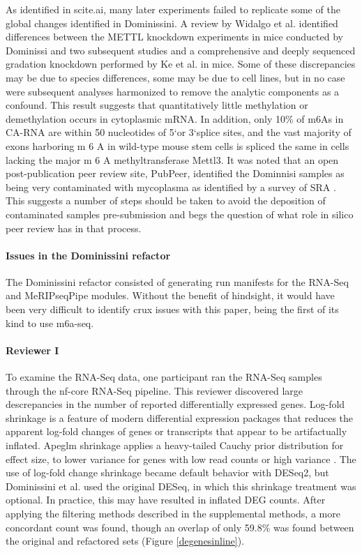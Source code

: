 \documentclass{drexelthesis}
\begin{document}
As identified in scite.ai, many later experiments failed to replicate some of the global changes identified in Dominissini. A review by Widalgo et al. \cite{Widagdo2018-vw} identified differences between the METTL knockdown experiments in mice conducted by Dominissi and two subsequent studies and a comprehensive and deeply sequenced gradation knockdown performed by Ke et al. \cite{Ke2017-lh} in mice. Some of these discrepancies may be due to species differences, some may be due to cell lines, but in no case were subsequent analyses harmonized to remove the analytic components as a confound. This result suggests that quantitatively little methylation or demethylation occurs in cytoplasmic mRNA. In addition, only 10\% of m6As in CA-RNA are within 50 nucleotides of 5\lq or 3\lq splice sites, and the vast majority of exons harboring m 6 A in wild-type mouse stem cells is spliced the same in cells lacking the major m 6 A methyltransferase Mettl3. It was noted that an open post-publication peer review site, PubPeer, identified the Dominnisi samples as being very contaminated with mycoplasma as identified by a survey of SRA \cite{Olarerin-George2015-hc}. This suggests a number of steps should be taken to avoid the deposition of contaminated samples pre-submission and begs the question of what role in silico peer review has in that process.

\paragraph{Issues in the Dominissini refactor}

The Dominissini refactor consisted of generating run manifests for the RNA-Seq and MeRIPseqPipe modules. Without the benefit of hindsight, it would have been very difficult to identify crux issues with this paper, being the first of its kind to use m6a-seq.

\paragraph{Reviewer I}

To examine the RNA-Seq data, one participant ran the RNA-Seq samples through the nf-core RNA-Seq pipeline. This reviewer discovered large descrepancies in the number of reported differentially expressed genes. Log-fold shrinkage is a feature of modern differential expression packages that reduces the apparent log-fold changes of genes or transcripts that appear to be artifactually inflated. Apeglm shrinkage applies a heavy-tailed Cauchy prior distribution for effect size, to lower variance for genes with low read counts or high variance \cite{Zhu2019-wo}. The use of log-fold change shrinkage became default behavior with DESeq2, but Dominissini et al. used the original DESeq, in which this shrinkage treatment was optional. In practice, this may have resulted in inflated DEG counts. After applying the filtering methods described in the supplemental methods, a more concordant count was found, though an overlap of only 59.8$\%$ was found between the original and refactored sets (Figure \ref{degenesinline}).
\end{document}
